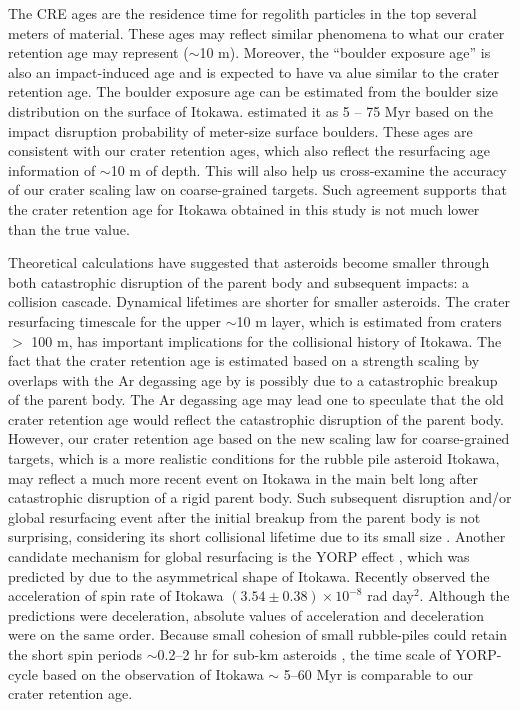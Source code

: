 \documentclass[3p,authoryear]{elsarticle}
\begin{document}
The CRE ages are the residence time for regolith particles in the top several meters of material. These ages may reflect similar phenomena to what our crater retention age may represent ($\sim$10 m). Moreover, the “boulder exposure age” is also an impact-induced age and is expected to have va alue similar to the crater retention age. The boulder exposure age can be estimated from the boulder size distribution on the surface of Itokawa. \citet{basilevsky2014} estimated it as 5 -- 75 Myr based on the impact disruption probability of meter-size surface boulders. These ages are consistent with our crater retention ages, which also reflect the resurfacing age information of $\sim$10 m of depth. This will also help us cross-examine the accuracy of our crater scaling law on coarse-grained targets. Such agreement supports that the crater retention age for Itokawa obtained in this study is not much lower than the true value.

Theoretical calculations have suggested that asteroids become smaller through both catastrophic disruption of the parent body and subsequent impacts: a collision cascade. Dynamical lifetimes are shorter for smaller asteroids. The crater resurfacing timescale for the upper $\sim$10 m layer, which is estimated from craters $>$ 100 m, has important implications for the collisional history of Itokawa. The fact that the crater retention age is estimated based on a strength scaling by \citet{michel2009} overlaps with the Ar degassing age by \citet{park2015} is possibly due to a catastrophic breakup of the parent body. The Ar degassing age may lead one to speculate that the old crater retention age would reflect the catastrophic disruption of the parent body. However, our crater retention age based on the new scaling law for coarse-grained targets, which is a more realistic conditions for the rubble pile asteroid Itokawa, may reflect a much more recent event on Itokawa in the main belt long after catastrophic disruption of a rigid parent body. Such subsequent disruption and/or global resurfacing event after the initial breakup from the parent body is not surprising, considering its short collisional lifetime due to its small size \citep[e.g.,][]{obrien2005}. Another candidate mechanism for global resurfacing is the YORP effect \citep{bottke2006}, which was predicted by \citet{scheeres2008, breiter2009}due to the asymmetrical shape of Itokawa. Recently \citet{lowry2014} observed the acceleration of spin rate of Itokawa $(3.54\pm0.38)\times10^{-8}$ rad day$^2$. Although the predictions were deceleration, absolute values of acceleration and deceleration were on the same order. Because small cohesion of small rubble-piles could retain the short spin periods $\sim$0.2--2 hr for sub-km asteroids \citet{sanchez2014}, the time scale of YORP-cycle based on the observation of Itokawa $\sim$ 5--60 Myr is comparable to our crater retention age. 
\end{document}
